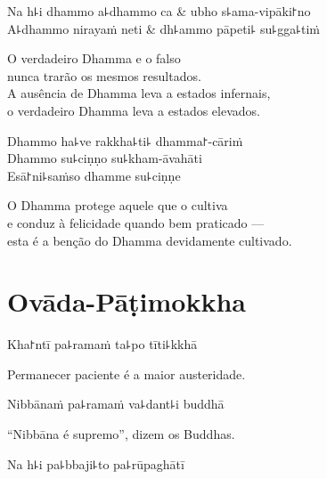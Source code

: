 \clearpage

\begin{twochants}
  Na h꜕i dhammo a꜕dhammo ca & ubho s꜕ama-vipāki꜓no \\
  A꜕dhammo nirayaṁ neti & dh꜕ammo pāpeti꜕ su꜕gga꜕tiṁ \\
\end{twochants}

\begin{english}
  O verdadeiro Dhamma e o falso\\
  nunca trarão os mesmos resultados.\\
  A ausência de Dhamma leva a estados infernais,\\
  o verdadeiro Dhamma leva a estados elevados.
\end{english}

Dhammo ha꜕ve rakkha꜕ti꜕ dhamma꜓-cāriṁ\\
Dhammo su꜕ciṇṇo su꜕kham-āvahāti\\
Esā꜓ni꜕saṁso dhamme su꜕ciṇṇe

\begin{english}
  O Dhamma protege aquele que o cultiva\\
  e conduz à felicidade quando bem praticado ---\\
  esta é a benção do Dhamma devidamente cultivado.
\end{english}

\chapter{Ovāda-Pāṭimokkha}


\enlargethispage{\baselineskip}

\begin{leader}
\end{leader}

Kha꜓ntī pa꜕ramaṁ ta꜕po tīti꜕kkhā

\begin{english}
  Permanecer paciente é a maior austeridade.
\end{english}

Nibbānaṁ pa꜕ramaṁ va꜕dant꜕i buddhā

\begin{english}
  “Nibbāna é supremo”, dizem os Buddhas.
\end{english}

Na h꜕i pa꜕bbaji꜕to pa꜕rūpaghātī

